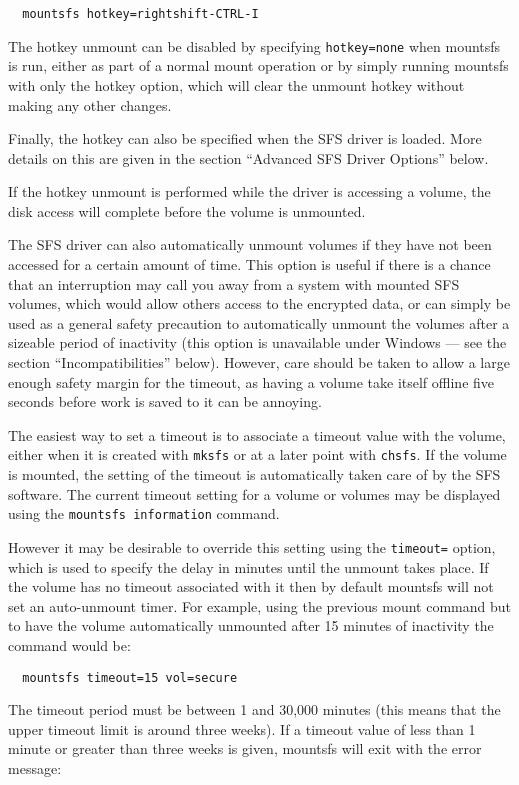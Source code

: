 {\tt \verb|  |mountsfs hotkey=rightshift-CTRL-I}

The hotkey unmount can be disabled by specifying {\tt hotkey=none} when mountsfs is
run, either as part of a normal mount operation or by simply running mountsfs
with only the hotkey option, which will clear the unmount hotkey without making
any other changes.

Finally, the hotkey can also be specified when the SFS driver is loaded.  More
details on this are given in the section ``Advanced SFS Driver Options'' below.

If the hotkey unmount is performed while the driver is accessing a volume, the
disk access will complete before the volume is unmounted.

The SFS driver can also automatically unmount volumes if they have not been
accessed for a certain amount of time.  This option is useful if there is a
chance that an interruption may call you away from a system with mounted SFS
volumes, which would allow others access to the encrypted data, or can simply 
be used as a general safety precaution to automatically unmount the volumes 
after a sizeable period of inactivity (this option is unavailable under Windows
--- see the section ``Incompatibilities'' below).  However, care should be taken to 
allow a large enough safety margin for the timeout, as having a volume take 
itself offline five seconds before work is saved to it can be annoying.

The easiest way to set a timeout is to associate a timeout value with the
volume, either when it is created with {\tt mksfs} or at a later point with {\tt chsfs}.
If the volume is mounted, the setting of the timeout is automatically taken
care of by the SFS software.  The current timeout setting for a volume or
volumes may be displayed using the {\tt mountsfs information} command.

However it may be desirable to override this setting using the {\tt timeout=} 
option, which is used to specify the delay in minutes until the unmount takes 
place.  If the volume has no timeout associated with it then by default
mountsfs will not set an auto-unmount timer.  For example, using the previous
mount command but to have the volume automatically unmounted after 15 minutes 
of inactivity the command would be:

{\tt \verb|  |mountsfs timeout=15 vol=secure}

The timeout period must be between 1 and 30,000 minutes (this means that the 
upper timeout limit is around three weeks).  If a timeout value of less than 1 
minute or greater than three weeks is given, mountsfs will exit with the error
message:

